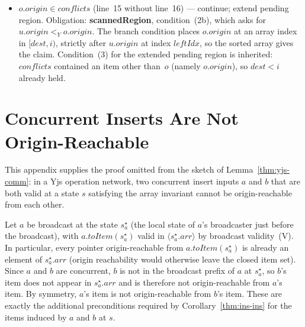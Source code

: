 \documentclass[sigplan,screen]{acmart}
\newcommand{\YjsLt}{\mathrel{<_Y}}
\begin{document}
\begin{itemize}
\item \emph{$o.\mathit{origin} \in \mathit{conflicts}$}
  (line~15 without line~16) ---
  continue; extend pending region.
  Obligation: \textbf{scannedRegion},
  condition~(2b), which asks for
  $u.\mathit{origin} \YjsLt o.\mathit{origin}$.
  The branch condition places $o.\mathit{origin}$ at an
  array index in $[\mathit{dest}, i)$, strictly after
  $u.\mathit{origin}$ at index $\mathit{leftIdx}$, so the
  sorted array gives the claim.  Condition~(3) for the
  extended pending region is inherited: $\mathit{conflicts}$
  contained an item other than~$o$ (namely $o.\mathit{origin}$),
  so $\mathit{dest} < i$ already held.
\end{itemize}

\section{Concurrent Inserts Are Not Origin-Reachable}
\label{app:not-reach}

This appendix supplies the proof omitted from the sketch of
Lemma~\ref{thm:yjs-comm}: in a Yjs operation network, two concurrent
insert inputs $a$ and $b$ that are both valid at a state $s$
satisfying the array invariant cannot be origin-reachable from each
other.

Let $a$ be broadcast at the state $s_a^\star$ (the local state of $a$'s
broadcaster just before the broadcast), with $a.\mathit{toItem}(s_a^\star)$
valid in $\langle s_a^\star.\mathit{arr} \rangle$ by broadcast
validity~(V).  In particular, every pointer origin-reachable from
$a.\mathit{toItem}(s_a^\star)$ is already an element of
$s_a^\star.\mathit{arr}$ (origin reachability would otherwise leave the
closed item set).  Since $a$ and $b$ are concurrent, $b$ is not in
the broadcast prefix of $a$ at $s_a^\star$, so $b$'s item does not
appear in $s_a^\star.\mathit{arr}$ and is therefore not
origin-reachable from $a$'s item.  By symmetry, $a$'s item is not
origin-reachable from $b$'s item.  These are exactly
the additional preconditions required by Corollary~\ref{thm:ins-ins}
for the items induced by $a$ and $b$ at $s$.
\end{document}
